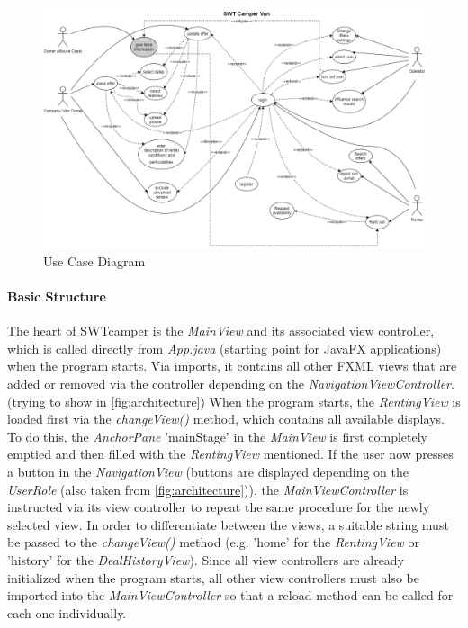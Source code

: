 \begin{figure}[h]
	\centering
	\includegraphics[width=12cm]{resources/images/use-case-diagram.png}
	\caption{Use Case Diagram}
	\label{fig:use-case-diagram}
\end{figure}

\paragraph{Basic Structure}
The heart of SWTcamper is the \textit{MainView} and its associated view controller, which is called directly from \textit{App.java} (starting point for JavaFX applications) when the program starts. Via imports, it contains all other FXML views that are added or removed via the controller depending on the \textit{NavigationViewController}. (trying to show in \ref{fig:architecture}) When the program starts, the \textit{RentingView} is loaded first via the \textit{changeView()} method, which contains all available displays. To do this, the \textit{AnchorPane} 'mainStage' in the \textit{MainView} is first completely emptied and then filled with the \textit{RentingView} mentioned. If the user now presses a button in the \textit{NavigationView} (buttons are displayed depending on the \textit{UserRole} (also taken from \ref{fig:architecture})), the \textit{MainViewController} is instructed via its view controller to repeat the same procedure for the newly selected view. In order to differentiate between the views, a suitable string must be passed to the \textit{changeView()} method (e.g. 'home' for the \textit{RentingView} or 'history' for the \textit{DealHistoryView}). Since all view controllers are already initialized when the program starts, all other view controllers must also be imported into the \textit{MainViewController} so that a reload method can be called for each one individually.

